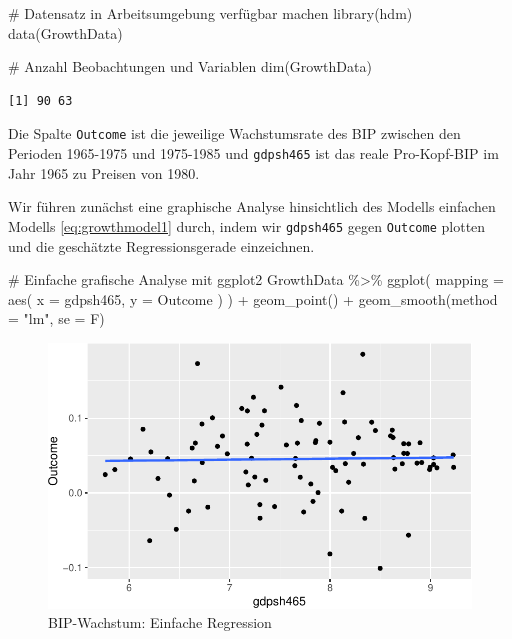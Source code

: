 \documentclass[
  a4paper,
  DIV=11,
  oneside]{scrreprt}
\newenvironment{Shaded}{\begin{snugshade}}{\end{snugshade}}
\newcommand{\AttributeTok}[1]{\textcolor[rgb]{0.40,0.45,0.13}{#1}}
\newcommand{\CommentTok}[1]{\textcolor[rgb]{0.37,0.37,0.37}{#1}}
\newcommand{\FunctionTok}[1]{\textcolor[rgb]{0.28,0.35,0.67}{#1}}
\newcommand{\NormalTok}[1]{\textcolor[rgb]{0.00,0.23,0.31}{#1}}
\newcommand{\SpecialCharTok}[1]{\textcolor[rgb]{0.37,0.37,0.37}{#1}}
\newcommand{\StringTok}[1]{\textcolor[rgb]{0.13,0.47,0.30}{#1}}
\begin{document}
\begin{Shaded}
\begin{Highlighting}[]
\CommentTok{\# Datensatz in Arbeitsumgebung verfügbar machen}
\FunctionTok{library}\NormalTok{(hdm)}
\FunctionTok{data}\NormalTok{(GrowthData)}

\CommentTok{\# Anzahl Beobachtungen und Variablen}
\FunctionTok{dim}\NormalTok{(GrowthData)}
\end{Highlighting}
\end{Shaded}

\begin{verbatim}
[1] 90 63
\end{verbatim}

Die Spalte \texttt{Outcome} ist die jeweilige Wachstumsrate des BIP
zwischen den Perioden 1965-1975 und 1975-1985 und \texttt{gdpsh465} ist
das reale Pro-Kopf-BIP im Jahr 1965 zu Preisen von 1980.

Wir führen zunächst eine graphische Analyse hinsichtlich des Modells
einfachen Modells \eqref{eq:growthmodel1} durch, indem wir
\texttt{gdpsh465} gegen \texttt{Outcome} plotten und die geschätzte
Regressionsgerade einzeichnen.

\begin{Shaded}
\begin{Highlighting}[]
\CommentTok{\# Einfache grafische Analyse mit ggplot2}
\NormalTok{GrowthData }\SpecialCharTok{\%\textgreater{}\%}
  \FunctionTok{ggplot}\NormalTok{(}
    \AttributeTok{mapping =} \FunctionTok{aes}\NormalTok{(}
      \AttributeTok{x =}\NormalTok{ gdpsh465, }
      \AttributeTok{y =}\NormalTok{ Outcome}
\NormalTok{    )}
\NormalTok{  ) }\SpecialCharTok{+}
  \FunctionTok{geom\_point}\NormalTok{() }\SpecialCharTok{+}
  \FunctionTok{geom\_smooth}\NormalTok{(}\AttributeTok{method =} \StringTok{"lm"}\NormalTok{, }\AttributeTok{se =}\NormalTok{ F)}
\end{Highlighting}
\end{Shaded}

\begin{figure}[t]

{\centering \includegraphics{RegReg_files/figure-pdf/fig-bipsimple-1.pdf}

}

\caption{\label{fig-bipsimple}BIP-Wachstum: Einfache Regression}

\end{figure}
\end{document}
